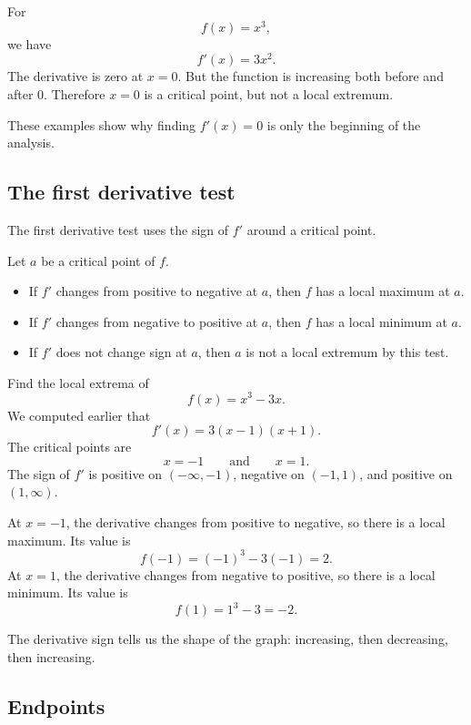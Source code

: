 \begin{examplebox}
For
\[
f(x)=x^3,
\]
we have
\[
f'(x)=3x^2.
\]
The derivative is zero at \(x=0\). But the function is increasing both before and after \(0\). Therefore \(x=0\) is a critical point, but not a local extremum.
\end{examplebox}

These examples show why finding \(f'(x)=0\) is only the beginning of the analysis.

\subsection*{The first derivative test}

The first derivative test uses the sign of \(f'\) around a critical point.

\begin{theorembox}
Let \(a\) be a critical point of \(f\).
\begin{itemize}
\item If \(f'\) changes from positive to negative at \(a\), then \(f\) has a local maximum at \(a\).
\item If \(f'\) changes from negative to positive at \(a\), then \(f\) has a local minimum at \(a\).
\item If \(f'\) does not change sign at \(a\), then \(a\) is not a local extremum by this test.
\end{itemize}
\end{theorembox}

\begin{examplebox}
Find the local extrema of
\[
f(x)=x^3-3x.
\]
We computed earlier that
\[
f'(x)=3(x-1)(x+1).
\]
The critical points are
\[
x=-1
\qquad\text{and}\qquad
x=1.
\]
The sign of \(f'\) is positive on \((-\infty,-1)\), negative on \((-1,1)\), and positive on \((1,\infty)\).

At \(x=-1\), the derivative changes from positive to negative, so there is a local maximum. Its value is
\[
f(-1)=(-1)^3-3(-1)=2.
\]
At \(x=1\), the derivative changes from negative to positive, so there is a local minimum. Its value is
\[
f(1)=1^3-3=-2.
\]
\end{examplebox}

The derivative sign tells us the shape of the graph: increasing, then decreasing, then increasing.

\subsection*{Endpoints}

